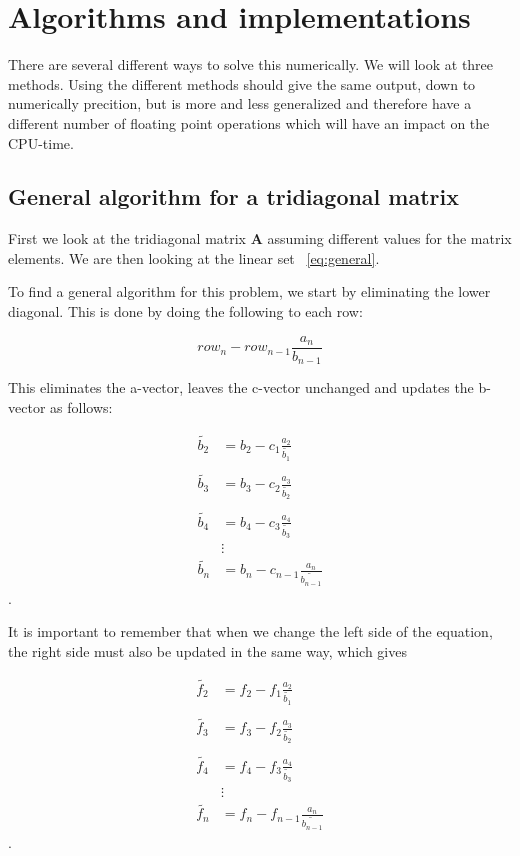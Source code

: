 \documentclass[a4paper,norsk,12pt,oneside]{article}
\begin{document}
\section{Algorithms and implementations}

There are several different ways to solve this numerically. We will look at three methods.
Using the different methods should give the same output, down to numerically precition, 
but is more and less generalized and therefore have a different number of floating point
operations which will have an impact on the CPU-time. 

\subsection{General algorithm for a tridiagonal matrix}\label{subsec:general}

First we look at the tridiagonal matrix \(\textbf{A}\) assuming different values
for the matrix elements. 
We are then looking at the linear set ~\ref{eq:general}. 

To find a general algorithm for this problem, we start by eliminating the lower diagonal.
This is done by doing the following to each row: 

\begin{equation}\label{eq:rowred}
    row_n - row_{n-1} \frac{a_n}{b_{n-1}}
\end{equation}

This eliminates the a-vector, leaves the c-vector unchanged and updates the b-vector as follows:


\begin{align*}
    \tilde{b_2} &= b_2 - c_1 \frac{a_2}{\tilde{b_1}}\\\\
    \tilde{b_3} &= b_3 - c_2 \frac{a_3}{\tilde{b_2}}\\\\
    \tilde{b_4} &= b_4 - c_3 \frac{a_4}{\tilde{b_3}}\\
    &\vdots \\
    \tilde{b_n} &= b_n - c_{n-1} \frac{a_n}{\tilde{b_{n-1}}} 
\end{align*}. 

It is important to remember that when we change the left side of the equation, the right side
must also be updated in the same way, which gives 

\begin{align*}
    \tilde{f_2} &= f_2 - f_1 \frac{a_2}{\tilde{b_1}}\\\\
    \tilde{f_3} &= f_3 - f_2 \frac{a_3}{\tilde{b_2}}\\\\
    \tilde{f_4} &= f_4 - f_3 \frac{a_4}{\tilde{b_3}}\\
    &\vdots \\
    \tilde{f_n} &= f_n - f_{n-1} \frac{a_n}{\tilde{b_{n-1}}} 
\end{align*}.
\end{document}
